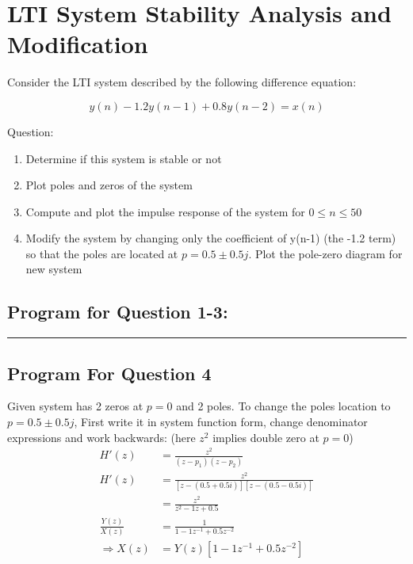 \section{LTI System Stability Analysis and Modification}
Consider the LTI system described by the following difference equation:

$$y(n)-1.2y(n-1)+0.8y(n-2)=x(n)$$

Question:

\begin{enumerate}
	\item Determine if this system is stable or not
	\item Plot poles and zeros of the system
	\item Compute and plot the impulse response of the system for $0\le n\le 50$
	\item Modify the system by changing only the coefficient of y(n-1) (the -1.2 term) so that the poles are located at $p=0.5\pm 0.5j$. Plot the pole-zero diagram for new system
\end{enumerate}

\subsection*{Program for Question 1-3:}



\begin{figure}[ht!]
	\begin{minipage}{.45\textwidth}
	\end{minipage}%
	\hfill%
	\begin{minipage}{.45\textwidth}
	\end{minipage}
\end{figure}

\hrule
\subsection*{Program For Question 4}
\vspace*{10pt}

Given system has 2 zeros at $p = 0$ and 2 poles. To change the poles location to $p=0.5\pm 0.5j$, First write it in system function form, change denominator expressions and work backwards: (here $z^2$ implies double zero at $p = 0$)
\begin{align*}
	H'(z) &= \frac{z^2}{(z - p_1)(z - p_2)}\\
	H'(z) &= \frac{z^2}{
		\left[z - \left(0.5 + 0.5i\right)\right]
		\left[z - \left(0.5 - 0.5i\right)\right]
	} \\
	 &= \frac{z^2}{z^2 -1z + 0.5} \\
	 \frac{Y(z)}{X(z)} &= \frac{1}{1 -1z^{-1} + 0.5z^{-2}} \\
	 \Rightarrow X(z) &= Y(z)\left[1 -1z^{-1} + 0.5z^{-2}\right]
\end{align*}

